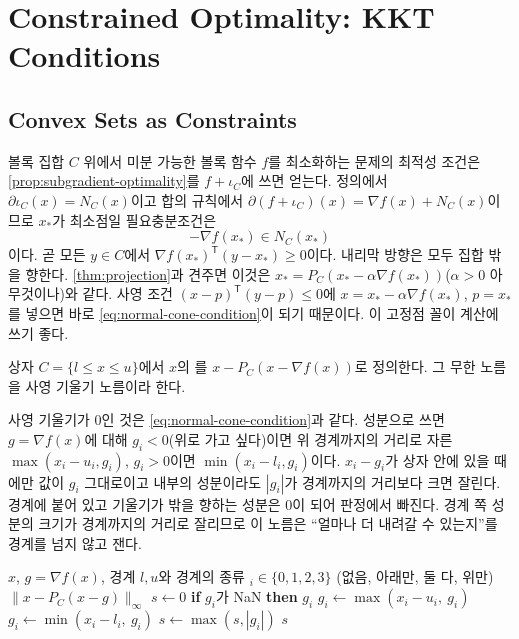 \section{Constrained Optimality: KKT Conditions}
\label{sec:kkt}

\subsection{Convex Sets as Constraints}

볼록 집합 $C$ 위에서 미분 가능한 볼록 함수 $f$를 최소화하는 문제의 최적성 조건은 \cref{prop:subgradient-optimality}를 $f+\iota_C$에 쓰면 얻는다. 정의에서 $\partial\iota_C(x)=N_C(x)$이고 합의 규칙에서 $\partial(f+\iota_C)(x)=\nabla f(x)+N_C(x)$이므로 $x_\ast$가 최소점일 필요충분조건은
\begin{equation}
\label{eq:normal-cone-condition}
-\nabla f(x_\ast)\in N_C(x_\ast)
\end{equation}
이다. 곧 모든 $y\in C$에서 $\nabla f(x_\ast)^{\mathsf T}(y-x_\ast)\ge0$이다. 내리막 방향은 모두 집합 밖을 향한다. \cref{thm:projection}과 견주면 이것은 $x_\ast=P_C(x_\ast-\alpha\nabla f(x_\ast))$($\alpha>0$ 아무것이나)와 같다. 사영 조건 $(x-p)^{\mathsf T}(y-p)\le0$에 $x=x_\ast-\alpha\nabla f(x_\ast)$, $p=x_\ast$를 넣으면 바로 \cref{eq:normal-cone-condition}이 되기 때문이다. 이 고정점 꼴이 계산에 쓰기 좋다.

\begin{definition}
\label{def:projected-gradient}
상자 $C=\{l\le x\le u\}$에서 $x$의 를 $x-P_C(x-\nabla f(x))$로 정의한다. 그 무한 노름을 사영 기울기 노름이라 한다.
\end{definition}

사영 기울기가 $0$인 것은 \cref{eq:normal-cone-condition}과 같다. 성분으로 쓰면 $g=\nabla f(x)$에 대해 $g_i<0$(위로 가고 싶다)이면 위 경계까지의 거리로 자른 $\max(x_i-u_i,g_i)$, $g_i>0$이면 $\min(x_i-l_i,g_i)$이다. $x_i-g_i$가 상자 안에 있을 때에만 값이 $g_i$ 그대로이고 내부의 성분이라도 $|g_i|$가 경계까지의 거리보다 크면 잘린다. 경계에 붙어 있고 기울기가 밖을 향하는 성분은 $0$이 되어 판정에서 빠진다. 경계 쪽 성분의 크기가 경계까지의 거리로 잘리므로 이 노름은 ``얼마나 더 내려갈 수 있는지''를 경계를 넘지 않고 잰다.

\begin{algorithm}[htbp]
\begin{algorithmic}[1]
\Require $x$, $g=\nabla f(x)$, 경계 $l,u$와 경계의 종류 $_i\in\{0,1,2,3\}$ (없음, 아래만, 둘 다, 위만)
\Ensure $\|x-P_C(x-g)\|_\infty$
\State $s\gets0$
  \State \textbf{if} $g_i$가 NaN \textbf{then} \Return $g_i$ 
   $g_i\gets\max(x_i-u_i,\ g_i)$
   $g_i\gets\min(x_i-l_i,\ g_i)$
  \EndIf
  \State $s\gets\max(s,|g_i|)$
\EndFor
\State \Return $s$
\end{algorithmic}
\caption{상자 제약의 사영 기울기 노름 (stardust 의 )}
\label{alg:projgr}
\end{algorithm}

